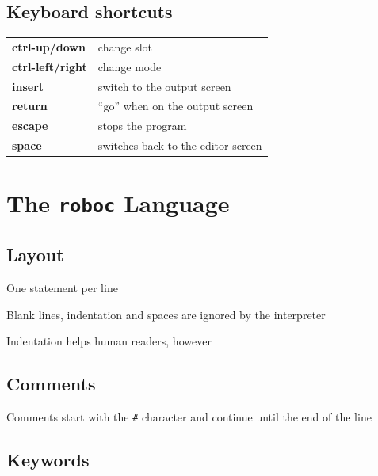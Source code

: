 \documentclass[12pt,a4paper,twoside]{article}
\renewcommand{\_}{\texttt{\symbol{95}}}
\begin{document}
\subsection{Keyboard shortcuts}

\begin{tabular}{|l|l|}
\hline
\textbf{ctrl-up/down} & change slot \\
\textbf{ctrl-left/right} & change mode \\
\textbf{insert} & switch to the output screen \\
\hline
\textbf{return} & ``go'' when on the output screen\\
\textbf{escape} & stops the program \\
\textbf{space} & switches back to the editor screen\\
\hline
\end{tabular}


\newpage
\section{The \textbf{\texttt{roboc}} Language}

\subsection{Layout}

\begin{bulletlist}
\item One statement per line
\item Blank lines, indentation and spaces are ignored by the interpreter
\item Indentation helps human readers, however%
\end{bulletlist}

\subsection{Comments}

\begin{bulletlist}
\item Comments start with the \verb^#^ character and continue until the end
      of the line
\end{bulletlist}

\subsection{Keywords}
\end{document}
